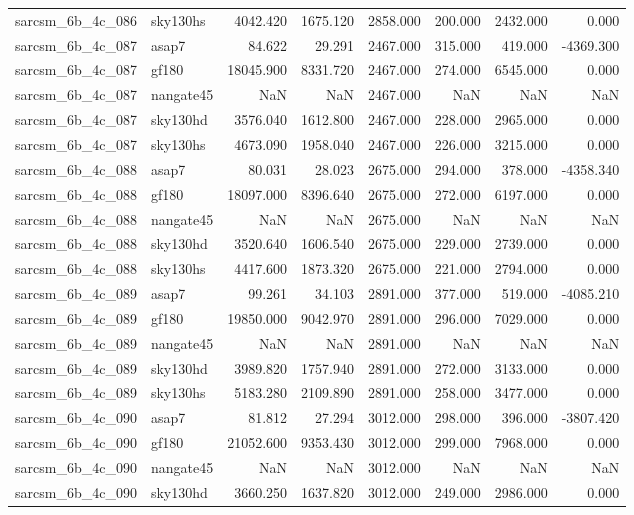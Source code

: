\begin{tabular}{llrrrrrr}
sarcsm\_6b\_4c\_086 & sky130hs & 4042.420 & 1675.120 & 2858.000 & 200.000 & 2432.000 & 0.000 \\
sarcsm\_6b\_4c\_087 & asap7 & 84.622 & 29.291 & 2467.000 & 315.000 & 419.000 & -4369.300 \\
sarcsm\_6b\_4c\_087 & gf180 & 18045.900 & 8331.720 & 2467.000 & 274.000 & 6545.000 & 0.000 \\
sarcsm\_6b\_4c\_087 & nangate45 & NaN & NaN & 2467.000 & NaN & NaN & NaN \\
sarcsm\_6b\_4c\_087 & sky130hd & 3576.040 & 1612.800 & 2467.000 & 228.000 & 2965.000 & 0.000 \\
sarcsm\_6b\_4c\_087 & sky130hs & 4673.090 & 1958.040 & 2467.000 & 226.000 & 3215.000 & 0.000 \\
sarcsm\_6b\_4c\_088 & asap7 & 80.031 & 28.023 & 2675.000 & 294.000 & 378.000 & -4358.340 \\
sarcsm\_6b\_4c\_088 & gf180 & 18097.000 & 8396.640 & 2675.000 & 272.000 & 6197.000 & 0.000 \\
sarcsm\_6b\_4c\_088 & nangate45 & NaN & NaN & 2675.000 & NaN & NaN & NaN \\
sarcsm\_6b\_4c\_088 & sky130hd & 3520.640 & 1606.540 & 2675.000 & 229.000 & 2739.000 & 0.000 \\
sarcsm\_6b\_4c\_088 & sky130hs & 4417.600 & 1873.320 & 2675.000 & 221.000 & 2794.000 & 0.000 \\
sarcsm\_6b\_4c\_089 & asap7 & 99.261 & 34.103 & 2891.000 & 377.000 & 519.000 & -4085.210 \\
sarcsm\_6b\_4c\_089 & gf180 & 19850.000 & 9042.970 & 2891.000 & 296.000 & 7029.000 & 0.000 \\
sarcsm\_6b\_4c\_089 & nangate45 & NaN & NaN & 2891.000 & NaN & NaN & NaN \\
sarcsm\_6b\_4c\_089 & sky130hd & 3989.820 & 1757.940 & 2891.000 & 272.000 & 3133.000 & 0.000 \\
sarcsm\_6b\_4c\_089 & sky130hs & 5183.280 & 2109.890 & 2891.000 & 258.000 & 3477.000 & 0.000 \\
sarcsm\_6b\_4c\_090 & asap7 & 81.812 & 27.294 & 3012.000 & 298.000 & 396.000 & -3807.420 \\
sarcsm\_6b\_4c\_090 & gf180 & 21052.600 & 9353.430 & 3012.000 & 299.000 & 7968.000 & 0.000 \\
sarcsm\_6b\_4c\_090 & nangate45 & NaN & NaN & 3012.000 & NaN & NaN & NaN \\
sarcsm\_6b\_4c\_090 & sky130hd & 3660.250 & 1637.820 & 3012.000 & 249.000 & 2986.000 & 0.000 \\

\end{tabular}
